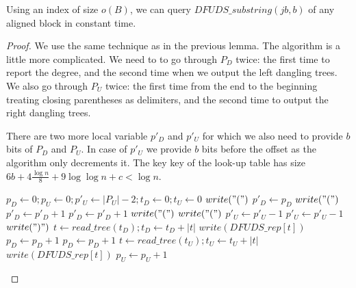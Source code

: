 \begin{lemma}
	Using an index of size $o(B)$, we can query $DFUDS\_substring(j b, b)$ of any aligned block in constant time.
\end{lemma}
\begin{proof}
	We use the same technique as in the previous lemma.
	The algorithm is a little more complicated.
	We need to to go through $P_D$ twice: the first time to report the degree, and the second time when we output the left dangling trees.
	We also go through $P_U$ twice: the first time from the end to the beginning treating closing parentheses as delimiters, and the second time to output the right dangling trees.
	
	There are two more local variable $p'_D$ and $p'_U$ for which we also need to provide $b$ bits of $P_D$ and $P_U$.
	In case of $p'_U$ we provide $b$ bits before the offset as the algorithm only decrements it.
	The key key of the look-up table has size $6b + 4 \frac{\log n}{8} + 9 \log \log n + c < \log n$.
	
	\begin{algorithm}
	\begin{algorithmic}
		\State $p_D \gets 0; p_U \gets 0; p'_U \gets |P_U| - 2; t_D \gets 0; t_U \gets 0$
		\State $write("(")$ 
			\State $p'_D \gets p_D$ 
			 
				\State $write("(")$
				\State $p'_D \gets p'_D + 1$
			\EndWhile
			\State $p'_D \gets p'_D + 1$ 
			 
				\State $write("(")$
			\EndIf
			 
				\State $write("(")$
				\State $p'_U \gets p'_U - 1$
			\EndWhile
			\State $p'_U \gets p'_U - 1$ 
			\State $write(")")$ 
			 
				\State $t \gets read\_tree(t_D); t_D \gets t_D + |t|$
				\State $write(DFUDS\_rep[t])$
				\State $p_D \gets p_D + 1$
			\EndWhile
			\State $p_D \gets p_D + 1$ 
		\EndWhile
		 
				\State $t \gets read\_tree(t_U); t_U \gets t_U + |t|$
				\State $write(DFUDS\_rep[t])$
			\EndIf
			\State $p_U \gets p_U + 1$ 
		\EndWhile
	\EndFunction
	\end{algorithmic}
	\end{algorithm}
\end{proof}

